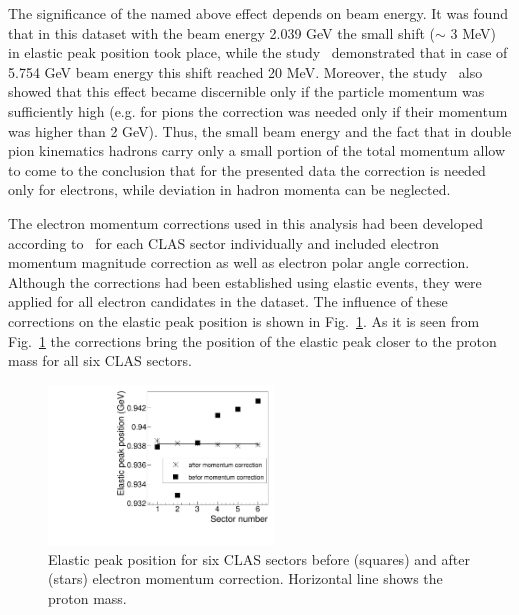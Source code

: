 \documentclass[prc,twocolumn,superscriptaddress,showpacs,amssymb,amsmath,amsfonts,linenumbers,aps]{revtex4-1}
\begin{document}
The significance of the named above effect depends on beam energy. It was found that in this dataset with the beam energy 2.039 GeV  the small shift ($\sim$ 3 MeV) in elastic peak position took place, while the study~\cite{KPark:momcorr} demonstrated that in case of  5.754 GeV beam energy this shift reached 20 MeV. Moreover, the study~\cite{KPark:momcorr} also showed that this effect became discernible only if the particle momentum was sufficiently high (e.g. for pions the correction was needed only if their momentum was higher than 2 GeV). Thus, the small beam energy and the fact that in double pion kinematics hadrons carry only a small portion of the total momentum allow to come to the conclusion that for the presented data the correction is needed only for electrons, while deviation in hadron momenta can be neglected.

The electron momentum corrections used in this analysis had been developed according to~\cite{KPark:momcorr} for each CLAS sector individually and included  electron momentum magnitude correction as well as electron polar angle correction. Although the corrections had been established using elastic events, they were applied for all electron candidates in the dataset.  The influence of these corrections on the elastic peak position is shown in Fig.~\ref{fig:elast_pic_position}. As it is seen from Fig.~\ref{fig:elast_pic_position} the corrections bring the position of the elastic peak closer to the proton mass for all six CLAS sectors.


\begin{figure}[htp]
\begin{center}
 \includegraphics[width=6cm,keepaspectratio]{pictures/mom_corr/elast_pic_position.pdf}
\vspace{-0.1cm}
\caption{Elastic peak position for six CLAS sectors before (squares) and after (stars) electron momentum correction. Horizontal line shows the proton mass. }
\label{fig:elast_pic_position}
\end{center}
\end{figure} 
\end{document}
